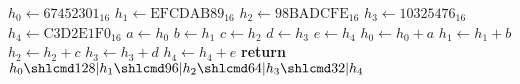\begin{algorithmic}[1]
\State $h_0\gets \textrm{67452301}_{16}$
\State $h_1\gets \textrm{EFCDAB89}_{16}$
\State $h_2\gets \textrm{98BADCFE}_{16}$
\State $h_3\gets \textrm{10325476}_{16}$
\State $h_4\gets \textrm{C3D2E1F0}_{16}$
\State $a\gets h_0$
\State $b\gets h_1$
\State $c\gets h_2$
\State $d\gets h_3$
\State $e\gets h_4$
\State $h_0\gets h_0+a$
\State $h_1\gets h_1+b$
\State $h_2\gets h_2+c$
\State $h_3\gets h_3+d$
\State $h_4\gets h_4+e$
\EndFor
\State \textbf{return} $h_0\shlcmd128|h_1\shlcmd96|h_2\shlcmd64|h_3\shlcmd32|h_4$
\EndProcedure
\end{algorithmic}
